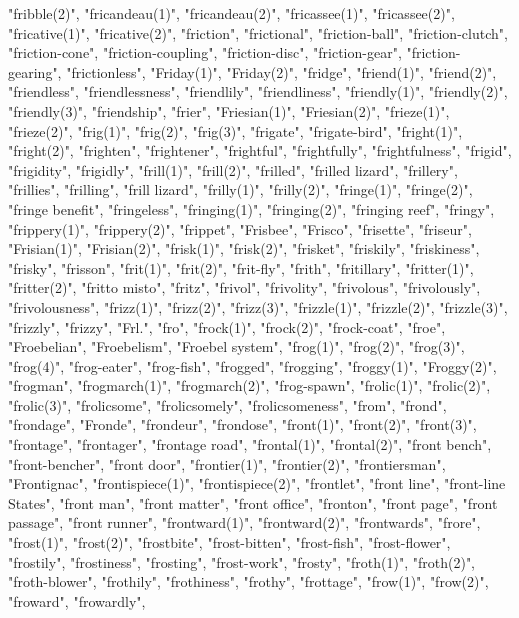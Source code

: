 "fribble(2)",
"fricandeau(1)",
"fricandeau(2)",
"fricassee(1)",
"fricassee(2)",
"fricative(1)",
"fricative(2)",
"friction",
"frictional",
"friction-ball",
"friction-clutch",
"friction-cone",
"friction-coupling",
"friction-disc",
"friction-gear",
"friction-gearing",
"frictionless",
"Friday(1)",
"Friday(2)",
"fridge",
"friend(1)",
"friend(2)",
"friendless",
"friendlessness",
"friendlily",
"friendliness",
"friendly(1)",
"friendly(2)",
"friendly(3)",
"friendship",
"frier",
"Friesian(1)",
"Friesian(2)",
"frieze(1)",
"frieze(2)",
"frig(1)",
"frig(2)",
"frig(3)",
"frigate",
"frigate-bird",
"fright(1)",
"fright(2)",
"frighten",
"frightener",
"frightful",
"frightfully",
"frightfulness",
"frigid",
"frigidity",
"frigidly",
"frill(1)",
"frill(2)",
"frilled",
"frilled lizard",
"frillery",
"frillies",
"frilling",
"frill lizard",
"frilly(1)",
"frilly(2)",
"fringe(1)",
"fringe(2)",
"fringe benefit",
"fringeless",
"fringing(1)",
"fringing(2)",
"fringing reef",
"fringy",
"frippery(1)",
"frippery(2)",
"frippet",
"Frisbee",
"Frisco",
"frisette",
"friseur",
"Frisian(1)",
"Frisian(2)",
"frisk(1)",
"frisk(2)",
"frisket",
"friskily",
"friskiness",
"frisky",
"frisson",
"frit(1)",
"frit(2)",
"frit-fly",
"frith",
"fritillary",
"fritter(1)",
"fritter(2)",
"fritto misto",
"fritz",
"frivol",
"frivolity",
"frivolous",
"frivolously",
"frivolousness",
"frizz(1)",
"frizz(2)",
"frizz(3)",
"frizzle(1)",
"frizzle(2)",
"frizzle(3)",
"frizzly",
"frizzy",
"Frl.",
"fro",
"frock(1)",
"frock(2)",
"frock-coat",
"froe",
"Froebelian",
"Froebelism",
"Froebel system",
"frog(1)",
"frog(2)",
"frog(3)",
"frog(4)",
"frog-eater",
"frog-fish",
"frogged",
"frogging",
"froggy(1)",
"Froggy(2)",
"frogman",
"frogmarch(1)",
"frogmarch(2)",
"frog-spawn",
"frolic(1)",
"frolic(2)",
"frolic(3)",
"frolicsome",
"frolicsomely",
"frolicsomeness",
"from",
"frond",
"frondage",
"Fronde",
"frondeur",
"frondose",
"front(1)",
"front(2)",
"front(3)",
"frontage",
"frontager",
"frontage road",
"frontal(1)",
"frontal(2)",
"front bench",
"front-bencher",
"front door",
"frontier(1)",
"frontier(2)",
"frontiersman",
"Frontignac",
"frontispiece(1)",
"frontispiece(2)",
"frontlet",
"front line",
"front-line States",
"front man",
"front matter",
"front office",
"fronton",
"front page",
"front passage",
"front runner",
"frontward(1)",
"frontward(2)",
"frontwards",
"frore",
"frost(1)",
"frost(2)",
"frostbite",
"frost-bitten",
"frost-fish",
"frost-flower",
"frostily",
"frostiness",
"frosting",
"frost-work",
"frosty",
"froth(1)",
"froth(2)",
"froth-blower",
"frothily",
"frothiness",
"frothy",
"frottage",
"frow(1)",
"frow(2)",
"froward",
"frowardly",
